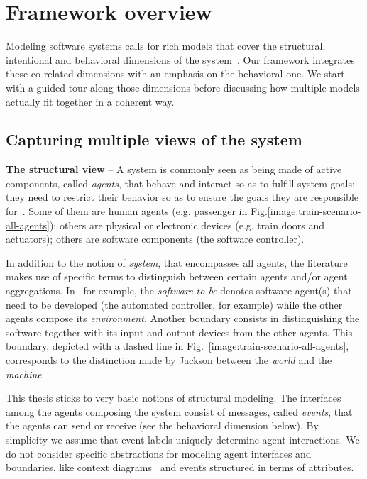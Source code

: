 \section{Framework overview\label{section:background-multi-agent-systems-and-behavior-modeling}}

Modeling software systems calls for rich models that cover the structural, intentional and behavioral dimensions of the system~\cite{VanLamsweerde:2000}. Our framework integrates these co-related dimensions with an emphasis on the behavioral one. We start with a guided tour along those dimensions before discussing how multiple models actually fit together in a coherent way.

\subsection{Capturing multiple views of the system\label{subsection:background-multiple-views}}

\noindent \textbf{The structural view} -- A system is commonly seen as being made of active components, called \emph{agents}, that behave and interact so as to fulfill system goals; they need to restrict their behavior so as to ensure the goals they are responsible for~\cite{Feather:1987}. Some of them are human agents (e.g. passenger in Fig.\ref{image:train-scenario-all-agents}); others are physical or electronic devices (e.g. train doors and actuators); others are software components (the software controller).

In addition to the notion of \emph{system}, that encompasses all agents, the literature makes use of specific terms to distinguish between certain agents and/or agent aggregations. In~\cite{VanLamsweerde:2009} for example, the \emph{software-to-be} denotes software agent(s) that need to be developed (the automated controller, for example) while the other agents compose its \emph{environment}. Another boundary consists in distinguishing the software together with its input and output devices from the other agents. This boundary, depicted with a dashed line in Fig.~\ref{image:train-scenario-all-agents}, corresponds to the distinction made by Jackson between the \emph{world} and the \emph{machine}~\cite{Jackson:1995}.

This thesis sticks to very basic notions of structural modeling. The interfaces among the agents composing the system consist of messages, called \emph{events}, that the agents can send or receive (see the behavioral dimension below). By simplicity we assume that event labels uniquely determine agent interactions. We do not consider specific abstractions for modeling agent interfaces and boundaries, like context diagrams~\cite{Jackson:1995} and events structured in terms of attributes.

